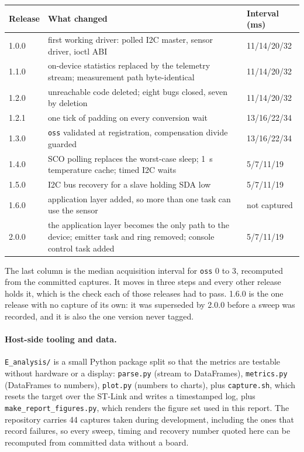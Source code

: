 \documentclass[10pt,a4]{article}
\begin{document}
\begin{center}
\small
\begin{tabular}{@{}l p{9.1cm} l@{}}
Release & What changed & Interval (ms) \\
\hline
1.0.0 & first working driver: polled I2C master, sensor driver, ioctl ABI & 11/14/20/32 \\
1.1.0 & on-device statistics replaced by the telemetry stream; measurement path byte-identical & 11/14/20/32 \\
1.2.0 & unreachable code deleted; eight bugs closed, seven by deletion & 11/14/20/32 \\
1.2.1 & one tick of padding on every conversion wait & 13/16/22/34 \\
1.3.0 & \texttt{oss} validated at registration, compensation divide guarded & 13/16/22/34 \\
1.4.0 & SCO polling replaces the worst-case sleep; 1~s temperature cache; timed I2C waits & 5/7/11/19 \\
1.5.0 & I2C bus recovery for a slave holding SDA low & 5/7/11/19 \\
1.6.0 & application layer added, so more than one task can use the sensor & not captured \\
2.0.0 & the application layer becomes the only path to the device; emitter task and ring removed; console control task added & 5/7/11/19 \\
\end{tabular}
\end{center}

The last column is the median acquisition interval for \texttt{oss} 0 to 3,
recomputed from the committed captures. It moves in three steps and every other
release holds it, which is the check each of those releases had to pass. 1.6.0
is the one release with no capture of its own: it was superseded by 2.0.0 before
a sweep was recorded, and it is also the one version never tagged.

\paragraph{Host-side tooling and data.} \texttt{E\_analysis/} is a small Python
package split so that the metrics are testable without hardware or a display:
\texttt{parse.py} (stream to DataFrames), \texttt{metrics.py} (DataFrames to
numbers), \texttt{plot.py} (numbers to charts), plus \texttt{capture.sh}, which
resets the target over the ST-Link and writes a timestamped log, plus
\texttt{make\_report\_figures.py}, which renders the figure set used in this
report. The repository carries 44 captures taken during development, including the ones
that record failures, so every sweep, timing and recovery number quoted here can
be recomputed from committed data without a board.
\end{document}
